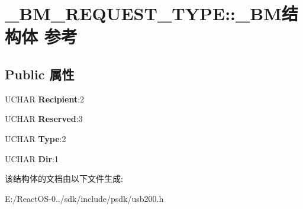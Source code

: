 \hypertarget{struct___b_m___r_e_q_u_e_s_t___t_y_p_e_1_1___b_m}{}\section{\+\_\+\+B\+M\+\_\+\+R\+E\+Q\+U\+E\+S\+T\+\_\+\+T\+Y\+PE\+:\+:\+\_\+\+B\+M结构体 参考}
\label{struct___b_m___r_e_q_u_e_s_t___t_y_p_e_1_1___b_m}
\subsection*{Public 属性}
\begin{DoxyCompactItemize}
\item 
\mbox{\label{struct___b_m___r_e_q_u_e_s_t___t_y_p_e_1_1___b_m_a40bb030777ebdba2d40e737430b8a672}} 
U\+C\+H\+AR {\bfseries Recipient}\+:2
\item 
\mbox{\label{struct___b_m___r_e_q_u_e_s_t___t_y_p_e_1_1___b_m_a100b3392d81443c55eae6d82142957a4}} 
U\+C\+H\+AR {\bfseries Reserved}\+:3
\item 
\mbox{\label{struct___b_m___r_e_q_u_e_s_t___t_y_p_e_1_1___b_m_a54de780c0afa7548f89cb6a4f86791ab}} 
U\+C\+H\+AR {\bfseries Type}\+:2
\item 
\mbox{\label{struct___b_m___r_e_q_u_e_s_t___t_y_p_e_1_1___b_m_aa04de928247a7c4e3b6e7205618c99a8}} 
U\+C\+H\+AR {\bfseries Dir}\+:1
\end{DoxyCompactItemize}


该结构体的文档由以下文件生成\+:\begin{DoxyCompactItemize}
\item 
E\+:/\+React\+O\+S-\/0../sdk/include/psdk/usb200.\+h\end{DoxyCompactItemize}
